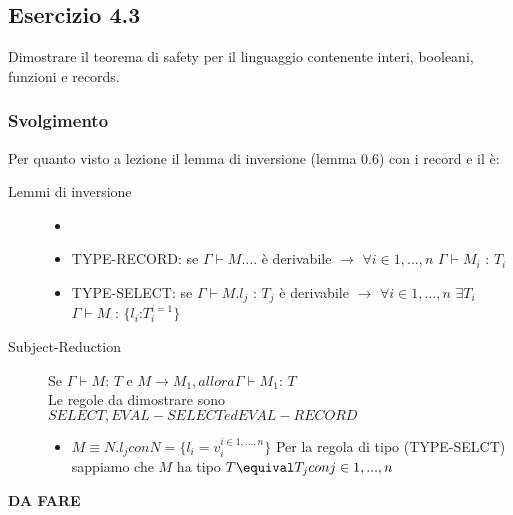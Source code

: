 	 
\subsection*{Esercizio 4.3}
Dimostrare il teorema di safety per il linguaggio contenente interi, booleani, funzioni e records.

\subsubsection*{Svolgimento}
Per quanto visto a lezione il lemma di inversione (lemma 0.6) con i record e il \`e:
\begin{description}

\item[Lemmi di inversione]{
	
\begin{itemize}

	\item 
	\item TYPE-RECORD: se $\Gamma \vdash M....$ \`e derivabile $\rightarrow$ $\forall i \in 1,...,n$ $\Gamma \vdash M_i$ : $T_i$ 
	
	\item TYPE-SELECT: se $\Gamma \vdash M.l_j$ : $T_j$ \`e derivabile $\rightarrow$ $\forall i \in 1,...,n$ $\exists T_i$ $\Gamma \vdash M$ : $ \{ l_i$:$T_i^{i=1} \}$ 
\end{itemize}

}

\item[Subject-Reduction]	{

	Se $\Gamma \vdash M $: $T$ e $M \rightarrow M_1, allora  \Gamma \vdash M_1 $: $T$\\
	Le regole da dimostrare sono $SELECT, EVAL-SELECT ed EVAL-RECORD$
	
	\begin{itemize}
		\item $M \equiv N.l_j con N = \{ l_i = v_i ^{i \in 1,...,n} \}$ %
		Per la regola di tipo (TYPE-SELCT) sappiamo che $M$ ha tipo $T \equival T_j con j \in 1,...,n $
	\end{itemize}


}

\end{description}


\textbf{{\color{red} DA FARE}}
	